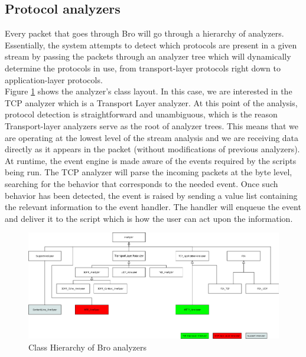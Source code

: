 \documentclass[12pt, a4paper, oneside]{article} %
\begin{document}
\subsection{Protocol analyzers}
Every packet that goes through Bro will go through a hierarchy of analyzers. Essentially, the system attempts to detect which protocols are present in a given stream by passing the packets through an analyzer tree which will dynamically determine the protocols in use, from transport-layer protocols right down to application-layer protocols. \\ 

Figure \ref{als} shows the analyzer's class layout. In this case, we are interested in the TCP analyzer which is a Transport Layer analyzer. At this point of the analysis, protocol detection is straightforward and unambiguous, which is the reason Transport-layer analyzers serve as the root of analyzer trees. This means that we are operating at the lowest level of the stream analysis and we are receiving data directly as it appears in the packet (without modifications of previous analyzers). At runtime, the event engine is made aware of the events required by the scripts being run. The TCP analyzer will parse the incoming packets at the byte level, searching for the behavior that corresponds to the needed event. Once such behavior has been detected, the event is raised by sending a value list containing the relevant information to the event handler. The handler will enqueue the event and deliver it to the script which is how the user can act upon the information. \\

\begin{figure}[!t]
\centering
\includegraphics[width=\columnwidth]{Figures/als.png}
\caption{Class Hierarchy of Bro analyzers}
\label{als}
\end{figure}
\end{document}
